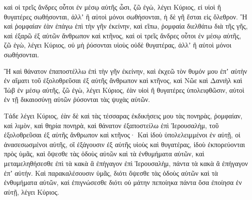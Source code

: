 {καὶ οἱ τρεῖς ἄνδρες οὗτοι ἐν μέσῳ αὐτῆς ὦσι, ζῶ ἐγὼ, λέγει Κύριος, εἰ υἱοὶ ἢ θυγατέρες σωθήσονται, ἀλλʼ ἢ αὐτοὶ μόνοι σωθήσονται, ἡ δὲ γῆ ἔσται εἰς ὄλεθρον.
Ἢ καὶ ῥομφαίαν ἐὰν ἐπάγω ἐπὶ τὴν γῆν ἐκείνην, καὶ εἴπω, ῥομφαία διελθάτω διὰ τῆς γῆς, καὶ ἐξαρῶ ἐξ αὐτῶν ἄνθρωπον καὶ κτῆνος,
καὶ οἱ τρεῖς ἄνδρες οὗτοι ἐν μέσῳ αὐτῆς, ζῶ ἐγὼ, λέγει Κύριος, οὐ μὴ ῥύσονται υἱοὺς οὐδὲ θυγατέρας, ἀλλʼ ἢ αὐτοὶ μόνοι σωθήσονται.
\par }{\PP {}Ἢ καὶ θάνατον ἐπαποστέλλω ἐπὶ τὴν γῆν ἐκείνην, καὶ ἐκχεῶ τὸν θυμόν μου ἐπʼ αὐτὴν ἐν αἵματι τοῦ ἐξολοθρεῦσαι ἐξ αὐτῆς ἄνθρωπον καὶ κτῆνος,
καὶ Νῶε καὶ Δανιὴλ καὶ Ἰὼβ ἐν μέσῳ αὐτῆς, ζῶ ἐγὼ, λέγει Κύριος, ἐὰν υἱοὶ ἢ θυγατέρες ὑπολειφθῶσιν, αὐτοὶ ἐν τῇ δικαιοσύνῃ αὐτῶν ῥύσονται τὰς ψυχὰς αὐτῶν.
\par }{\PP {}Τάδε λέγει Κύριος, ἐὰν δὲ καὶ τὰς τέσσαρας ἐκδικήσεις μου τὰς πονηρὰς, ῥομφαίαν, καὶ λιμὸν, καὶ θηρία πονηρὰ, καὶ θάνατον ἐξαποστείλω ἐπὶ Ἱερουσαλὴμ, τοῦ ἐξολοθρεῦσαι ἐξ αὐτῆς ἄνθρωπον καὶ κτῆνος·
Καὶ ἰδοὺ ὑπολελειμμένοι ἐν αὐτῇ, οἱ ἀνασεσωσμένοι αὐτῆς, οἳ ἐξάγουσιν ἐξ αὐτῆς υἱοὺς καὶ θυγατέρας, ἰδοὺ ἐκπορεύονται πρὸς ὑμᾶς, καὶ ὄψεσθε τὰς ὁδοὺς αὐτῶν καὶ τὰ ἐνθυμήματα αὐτῶν, καὶ μεταμεληθήσεσθε ἐπὶ τὰ κακὰ ἃ ἐπήγαγον ἐπὶ Ἱερουσαλὴμ, πάντα τὰ κακὰ ἃ ἐπήγαγον ἐπʼ αὐτήν.
Καὶ παρακαλέσουσιν ὑμᾶς, διότι ὄψεσθε τὰς ὁδοὺς αὐτῶν καὶ τὰ ἐνθυμήματα αὐτῶν, καὶ ἐπιγνώσεσθε διότι οὐ μάτην πεποίηκα πάντα ὅσα ἐποίησα ἐν αὐτῇ, λέγει Κύριος.

\par }
